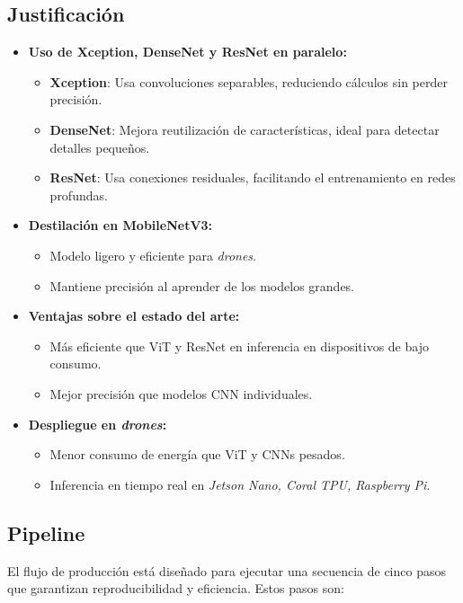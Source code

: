 \subsection{Justificación}

\begin{itemize}
    \item \textbf{Uso de Xception, DenseNet y ResNet en paralelo:}
    \begin{itemize}
        \item \textbf{Xception}: Usa convoluciones separables, reduciendo cálculos sin perder precisión.
        \item \textbf{DenseNet}: Mejora reutilización de características, ideal para detectar detalles pequeños.
        \item \textbf{ResNet}: Usa conexiones residuales, facilitando el entrenamiento en redes profundas.
    \end{itemize}
    \item \textbf{Destilación en MobileNetV3:}
    \begin{itemize}
        \item Modelo ligero y eficiente para \textit{drones}.
        \item Mantiene precisión al aprender de los modelos grandes.
    \end{itemize}
    \item \textbf{Ventajas sobre el estado del arte:}
    \begin{itemize}
        \item Más eficiente que ViT y ResNet en inferencia en dispositivos de bajo consumo.
        \item Mejor precisión que modelos CNN individuales.
    \end{itemize}
    \item \textbf{Despliegue en \textit{drones}:}
    \begin{itemize}
        \item Menor consumo de energía que ViT y CNNs pesados.
        \item Inferencia en tiempo real en \textit{Jetson Nano, Coral TPU, Raspberry Pi}.
    \end{itemize}
\end{itemize}

\subsection{Pipeline}
El flujo de producción está diseñado para ejecutar una secuencia de cinco pasos que garantizan reproducibilidad y eficiencia. Estos pasos son:

